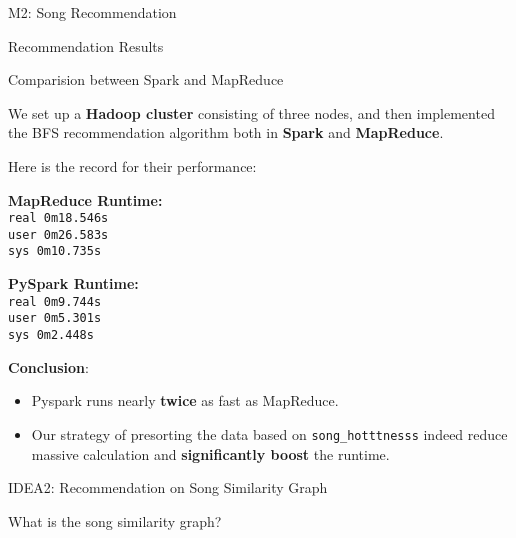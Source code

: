 \documentclass{beamer}
\begin{document}
\begin{section}{M2: Song Recommendation}
\begin{frame}{Recommendation Results}
    \end{frame}

    \begin{frame}{Comparision between Spark and MapReduce}

    We set up a \textbf{Hadoop cluster} consisting of three nodes, and then implemented the BFS recommendation algorithm both in \textbf{Spark} and \textbf{MapReduce}. 

    \vspace{0.2cm}
    
    Here is the record for their performance:
    
    \vspace{0.3cm}
    
    \begin{minipage}[b]{0.5\linewidth} 
        \textbf{MapReduce Runtime:} \\
        \centering
        \texttt{real    0m18.546s} \\
        \texttt{user    0m26.583s} \\
        \texttt{sys     0m10.735s}
    \end{minipage}%
    \begin{minipage}[b]{0.5\linewidth}
        \textbf{PySpark Runtime:}\\
        \centering
        \texttt{real    0m9.744s} \\
        \texttt{user    0m5.301s} \\
        \texttt{sys     0m2.448s} 
    \end{minipage}

    \vspace{0.3cm}
    
    \textbf{Conclusion}:
        \begin{itemize}
            \item Pyspark runs nearly \textbf{twice} as fast as MapReduce.
            \item Our strategy of presorting the data based on \texttt{song\_hotttnesss} indeed reduce massive calculation and \textbf{significantly boost} the runtime.
        \end{itemize}
    \end{frame}
    
    \begin{frame}{IDEA2: Recommendation on Song Similarity Graph}
    
    What is the song similarity graph? 


\end{frame}
\end{section}
\end{document}
